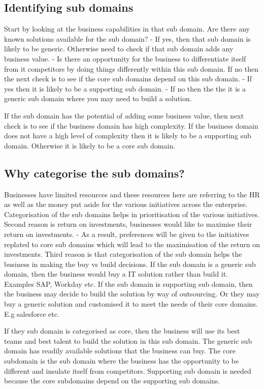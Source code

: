 \subsection{Identifying sub domains}
Start by looking at the business capabilities in that sub domain.
Are there any known solutions available for the sub domain?
- If yes, then that sub domain is likely to be generic.
Otherwise need to check if that sub domain adds any business value.
- Is there an opportunity for the business to differentiate itself from it competitors by doing things differently within this sub domain.
If no then the next check is to see if the core sub domains depend on this sub domain.
- If yes then it is likely to be a supporting sub domain.
- If no then the the it is a generic sub domain where you may need to build a solution.

If the sub domain has the potential of adding some business value, then next check is to see if the business domain has high complexity.
If the business domain does not have a high level of complexity then it is likely to be a supporting sub domain.
Otherwise it is likely to be a core sub domain.

\subsection{Why categorise the sub domains?}
Businesses have limited resources and these resources here are referring to the HR as well as the money put aside for the various initiatives across the enterprise.
Categorisation of the sub domains helps in prioritisation of the various initiatives.
Second reason is return on investments, businesses would like to maximise their return on investments.
- As a result, preferences will be given to the initiatives replated to core sub domains which will lead to the maximisation of the return on investments.
Third reason is that categorisation of the sub domain helps the business in making the buy vs build decisions.
If the sub domain is a generic sub domain, then the business would buy a IT solution rather than build it.
Examples SAP, Workday etc.
If the sub domain is supporting sub domain, then the business may decide to build the solution by way of outsourcing.
Or they may buy a generic solution and customised it to meet the needs of their core domains. E.g salesforce etc.

If they sub domain is categorised as core, then the business will use its best teams and best talent to build the solution in this sub domain.
The generic sub domain has readily available solutions that the business can buy.
The core subdomain is the sub domain where the business has the opportunity to be different and insulate itself from competitors.
Supporting sub domain is needed because the core subdomains depend on the supporting sub domains.

